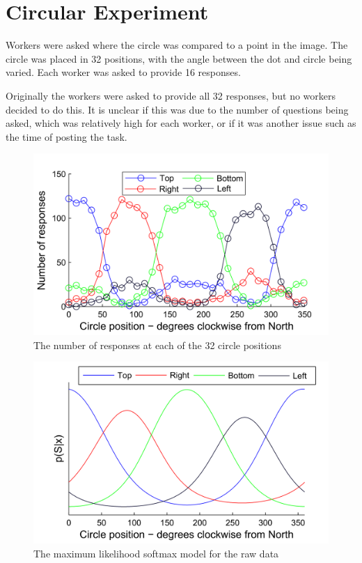 \chapter{Circular Experiment}

Workers were asked where the circle was compared to a point in the image.
The circle was placed in 32 positions, with the angle between the dot and circle being varied. Each worker was asked to provide 16 responses.

Originally the workers were asked to provide all 32 responses, but no workers decided to  do this. 
It is unclear if this was due to the number of questions being asked, which was relatively high for each worker, or if it was another issue such as the time of posting the task. 




\begin{figure}
	\centering
	\includegraphics[scale=1]{line_circular_raw_data.png}
	\caption{The number of responses at each of the 32 circle positions}
	\label{Figure:circular_raw_responses}
\end{figure}

\begin{figure}
	\centering
	\includegraphics[scale=1]{line_circular_raw_data_softmax.png}
	\caption{The maximum likelihood softmax model for the raw data}
	\label{Figure:cicular_raw_softmax_model_all_responses}
\end{figure}





